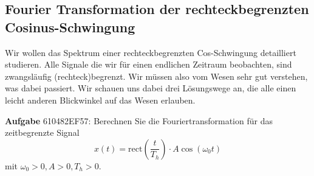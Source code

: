 \clearpage
\subsection{Fourier Transformation der rechteckbegrenzten Cosinus-Schwingung}
\label{sec:610482EF57}
\begin{Ziel}
Wir wollen das Spektrum einer rechteckbegrenzten Cos-Schwingung detailliert studieren. Alle Signale die wir für einen endlichen Zeitraum beobachten, sind zwangsläufig (rechteck)begrenzt.
Wir müssen also vom Wesen sehr gut verstehen, was dabei passiert.
Wir schauen uns dabei drei Lösungswege an, die alle einen leicht anderen
Blickwinkel auf das Wesen erlauben.
\end{Ziel}
\textbf{Aufgabe} {\tiny 610482EF57}: Berechnen Sie die Fouriertransformation für
das zeitbegrenzte Signal
\begin{equation}
x(t) = \mathrm{rect}(\frac{t}{T_h}) \cdot A \cos(\omega_0 t)
\end{equation}
mit $\omega_0>0, A>0, T_h>0$.

